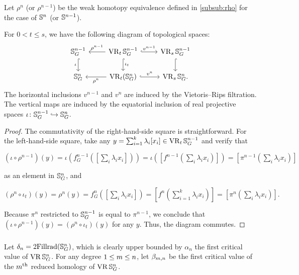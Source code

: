 Let $\rho^n$ (or $\rho^{n-1}$) be the weak homotopy equivalence defined in \cref{subsub:rho} for the case of $\mathbb{S}^n$ (or $\mathbb{S}^{n-1}$).

\medskip\lemma
For $0<t\leq s $, we have the following diagram of topological spaces:
\begin{equation}\label{d:fundamental_bars_diagram}
	\begin{tikzcd}
		\bS^{n-1}_G
		\ar[d, hook,"{\iota}" left]
		&
		\VR_t\bS^{n-1}_G
		\ar[d, hook,"\iota_t"]
		\ar[l, "\rho^{n-1}" above]
		\ar[r, hook, "v^{n-1}"]
		&
		\VR_{s}\bS^{n-1}_G
		\ar[d, hook]
		\\
		\bS^{n}_G
		&
		\VR_t(\bS^{n}_G)
		\ar[l, "\rho^n" below]
		\ar[r, hook, "v^{n}"]
		&
		\VR_{s}\bS^{n}_G.
	\end{tikzcd}
\end{equation}
The horizontal inclusions $v^{n-1}$ and $v^n$ are induced by the Vietoris--Rips filtration.
The vertical maps are induced by the equatorial inclusion of real projective spaces $\iota \colon \mathbb{S}^{n-1}_G \hookrightarrow \mathbb{S}^{n}_G$.

\begin{proof}
	The commutativity of the right-hand-side square is straightforward.
	For the left-hand-side square, take any $y = \sum_{i=1}^k \lambda_i [x_i] \in \operatorname{VR}_t\mathbb{S}^{n-1}_G$ and verify that
	\begin{center}
		$(\iota \circ \rho^{n-1})(y)
		=\iota(f^{n-1}_G([\sum_i \lambda_i x_i]))
		=\iota([f^{n-1}(\sum_i \lambda_i x_i)])
		=[\pi^{n-1}(\sum_i \lambda_i x_i)]
		$
	\end{center}
	as an element in $\mathbb{S}^n_G$, and
	\begin{center}
		$(\rho^{n} \circ \iota_t)(y) = \rho^{n}(y) = f^{n}_G([\sum_i \lambda_i x_i]) = [f^{n}(\sum_{i=1}^k \lambda_i x_i)] = [\pi^{n}(\sum_i \lambda_i x_i)].
		$
	\end{center}
	Because $\pi^{n}$ restricted to $\mathbb{S}^{n-1}_G$ is equal to $\pi^{n-1}$, we conclude that $(\iota \circ \rho^{n-1})(y) = (\rho^n \circ \iota_t)(y)$ for any $y$.
	Thus, the diagram commutes.
\end{proof}

\subsubsection{}
\label{subsub:foundamental_bar_rpn_lemma}

Let $\delta_n=2\mathrm{Fillrad}(\mathbb{S}^n_G)$, which is clearly upper bounded by $\alpha_n$ the first critical value of $\operatorname{VR}\mathbb{S}^n_G$.
For any degree $1 \leq m \leq n$, let $\beta_{m, n}$ be the first critical value of the $m^{\mathrm{th}}$ reduced homology of $\operatorname{VR}\mathbb{S}^n_G$.

